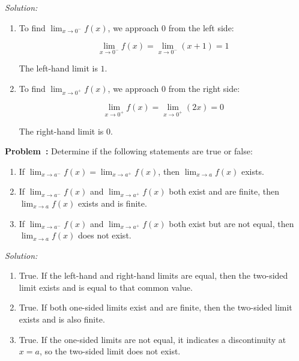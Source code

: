 \documentclass[a4paper,12pt]{book}
\newcounter{problem}
\newenvironment{problem}[1][\theproblem]
{\refstepcounter{problem}\par\medskip\noindent\textbf{Problem~#1:} \rmfamily}{\medskip}
\newenvironment{solution}[1][]
{\par\noindent\textit{Solution:} \rmfamily}{\medskip}
\begin{document}
\begin{solution}
\begin{enumerate}[label=(\alph*)]
  \item To find \( \lim_{{x \to 0^-}} f(x) \), we approach \( 0 \) from the left side:
  
  \[ \lim_{{x \to 0^-}} f(x) = \lim_{{x \to 0^-}} (x + 1) = 1 \]
  
  The left-hand limit is \( 1 \).
  
  \item To find \( \lim_{{x \to 0^+}} f(x) \), we approach \( 0 \) from the right side:
  
  \[ \lim_{{x \to 0^+}} f(x) = \lim_{{x \to 0^+}} (2x) = 0 \]
  
  The right-hand limit is \( 0 \).
\end{enumerate}
\end{solution}

\begin{problem}
Determine if the following statements are true or false:
\begin{enumerate}[label=(\alph*)]
  \item If \( \lim_{{x \to a^-}} f(x) = \lim_{{x \to a^+}} f(x) \), then \( \lim_{{x \to a}} f(x) \) exists.
  \item If \( \lim_{{x \to a^-}} f(x) \) and \( \lim_{{x \to a^+}} f(x) \) both exist and are finite, then \( \lim_{{x \to a}} f(x) \) exists and is finite.
  \item If \( \lim_{{x \to a^-}} f(x) \) and \( \lim_{{x \to a^+}} f(x) \) both exist but are not equal, then \( \lim_{{x \to a}} f(x) \) does not exist.
\end{enumerate}
\end{problem}

\begin{solution}
\begin{enumerate}[label=(\alph*)]
  \item True. If the left-hand and right-hand limits are equal, then the two-sided limit exists and is equal to that common value.
  \item True. If both one-sided limits exist and are finite, then the two-sided limit exists and is also finite.
  \item True. If the one-sided limits are not equal, it indicates a discontinuity at \( x = a \), so the two-sided limit does not exist.
\end{enumerate}
\end{solution}
\end{document}
